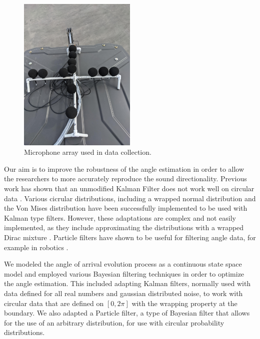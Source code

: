 \documentclass[11pt]{amsart}
\begin{document}
\begin{figure}[htp]
\includegraphics*[width=0.5\textwidth]{Pic of Real Mic Array.jpg}\hfill
\caption{Microphone array used in data collection.}
\label{fig:array}
\end{figure}

Our aim is to improve the robustness of the angle estimation in order to allow the researchers to more accurately reproduce the sound directionality. Previous work has shown that an unmodified Kalman Filter does not work well on circular data \cite{Research}. Various cicrular distributions, including a wrapped normal distribution and the Von Mises distribution have been successfully implemented to be used with Kalman type filters. However, these adaptations are complex and not easily implemented, as they include approximating the distributions with a wrapped Dirac mixture \cite{Research}. Particle filters have shown to be useful for filtering angle data, for example in robotics \cite{Oops}.

We modeled the angle of arrival evolution process as a continuous state space model and employed various Bayesian filtering techniques in order to optimize the angle estimation. This included adapting Kalman filters, normally used with data defined for all real numbers and gaussian distributed noise, to work with circular data that are defined on $[0,2\pi]$ with the wrapping property at the boundary. We also adapted a Particle filter, a type of Bayesian filter that allows for the use of an arbitrary distribution, for use with circular probability distributions.

\end{document}
